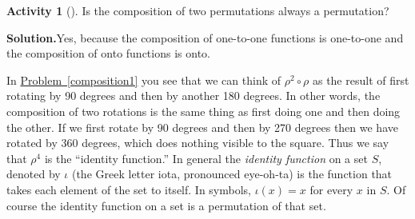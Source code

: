 \documentclass[10pt,]{book}
\theoremstyle{plain}
\theoremstyle{definition}
\newtheorem{activity}[project]{Activity}
\numberwithin{equation}{chapter}
\begin{document}
\begin{activity}[]\label{activity-250}
Is the composition of two permutations always a permutation?%
\par\medskip\noindent%
\textbf{Solution.}\quad Yes, because the composition of one-to-one functions is one-to-one and the composition of onto functions is onto.%
\end{activity}
In \hyperref[composition1]{Problem~\ref{composition1}} you see that we can think of \(\rho^2\circ\rho\) as the result of first rotating by 90 degrees and then by another 180 degrees. In other words, the composition of two rotations is the same thing as first doing one and then doing the other. If we first rotate by 90 degrees and then by 270 degrees then we have rotated by 360 degrees, which does nothing visible to the square. Thus we say that \(\rho^4\) is the ``identity function.'' In general the \emph{identity function} on a set \(S\), denoted by \(\iota\) (the Greek letter iota, pronounced eye-oh-ta) is the function that takes each element of the set to itself. In symbols, \(\iota(x) =x\) for every \(x\) in \(S\). Of course the identity function on a set is a permutation of that set.%
\typeout{************************************************}
\typeout{************************************************}
\end{document}

